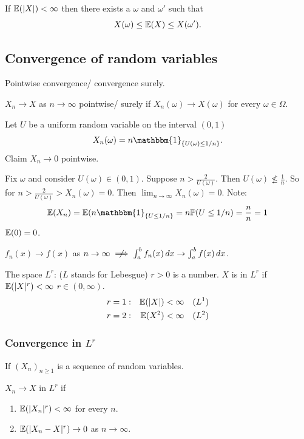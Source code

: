 \documentclass[10pt, a4paper]{article}
\begin{document}
\begin{lemma}
    If $\mathbb{E}(|X|) < \infty$ then there exists a $\omega$ and $\omega'$ such that
    \[
    X(\omega) \leq \mathbb{E}(X) \leq X(\omega').
    \]
\end{lemma}

\subsection{Convergence of random variables}

Pointwise convergence/
convergence surely.

$X_n \to X$ as $n \to \infty$ pointwise/
surely if $X_n(\omega) \to X(\omega)$ for every $\omega \in \Omega$.

\begin{example}
    Let $U$ be a uniform random variable on the interval $(0, 1)$
    \[
    X_{n}(\omega) = n\mathbbm{1}_{\{U(\omega) \leq 1 / n\}}.
    \]
    Claim $X_n \to 0$ pointwise.

    Fix $\omega$ and consider $U(\omega) \in (0, 1)$.
    Suppose $n > \frac{2}{U(\omega)}$.
    Then $U(\omega) \nleq \frac{1}{n}$.
    So for $n > \frac{2}{U(\omega)} > X_n(\omega) = 0$.
    Then $\lim_{n \to \infty}X_n(\omega) = 0$.
    Note:
    \[
    \E(X_n) = \E(n\mathbbm{1}_{\{U \leq 1 / n\}} = n\P(U \leq 1 / n) = \frac{n}{n} = 1
    \]
    $\mathbb{E}(0) = 0$.
\end{example}

$f_n(x) \to f(x)$ as $n \to \infty \centernot\implies \int_{a}^{b}f_n(x)\,dx \to \int_{a}^{b}f(x)\,dx$.

The space  $L ^ r$:
($L$ stands for Lebesgue)
$r > 0$ is a number.
$X$ is in $L ^ r$ if $\mathbb{E}(|X| ^ r) < \infty$ $r \in (0, \infty)$.
\begin{align*}
    r &= 1: & \mathbb{E}(|X|) &< \infty & (L ^ 1) \\
    r &= 2: & \mathbb{E}(X ^ 2) &< \infty & (L ^ 2)
\end{align*}

\subsubsection{Convergence in \texorpdfstring{$L ^ r$}{}}
If $(X_n)_{n \geq 1}$ is a sequence of random variables.

\begin{definition}
    $X_n \to X$ in $L ^ r$ if
    \begin{enumerate}[label = (\roman*)]
        \item $\mathbb{E}(|X_n| ^ r) < \infty$ for every $n$.

        \item $\mathbb{E}(|X_n - X| ^ r) \to 0$ as $n \to \infty$.
    \end{enumerate}
\end{definition}
\end{document}
